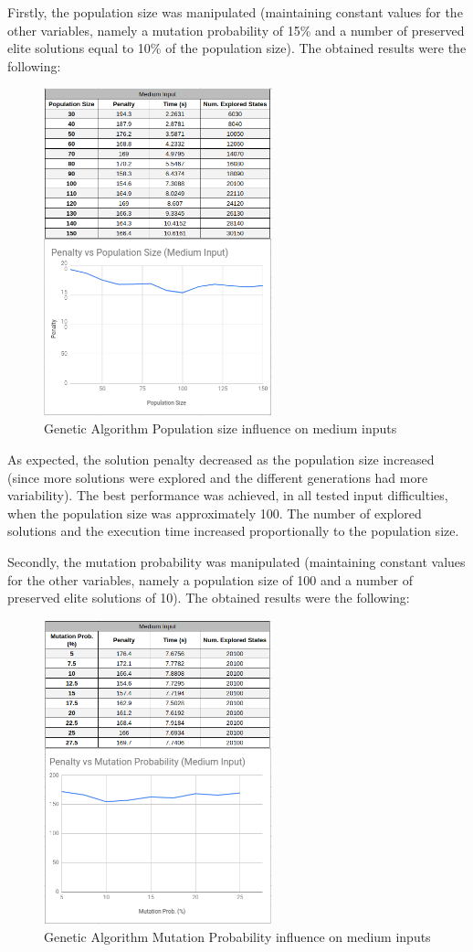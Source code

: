 \documentclass[conference]{IEEEtran}
\begin{document}
Firstly, the population size was manipulated (maintaining constant values for the other variables, namely a mutation probability of 15\% and a number of preserved elite solutions equal to 10\% of the population size). The obtained results were the following: 

\begin{figure}[H]
    \centerline{\includegraphics[width=250px]{genetic_pop_size_medium.png}}
    \caption{Genetic Algorithm Population size influence on medium inputs}
\end{figure}

As expected, the solution penalty decreased as the population size increased (since more solutions were explored and the different generations had more variability). The best performance was achieved, in all tested input difficulties, when the population size was approximately 100. The number of explored solutions and the execution time increased proportionally to the population size.

Secondly, the mutation probability was manipulated (maintaining constant values for the other variables, namely a population size of 100 and a number of preserved elite solutions of 10). The obtained results were the following: 

\begin{figure}[H]
    \centerline{\includegraphics[width=250px]{mutation_prob_medium.png}}
    \caption{Genetic Algorithm Mutation Probability influence on medium inputs}
\end{figure}
\end{document}
